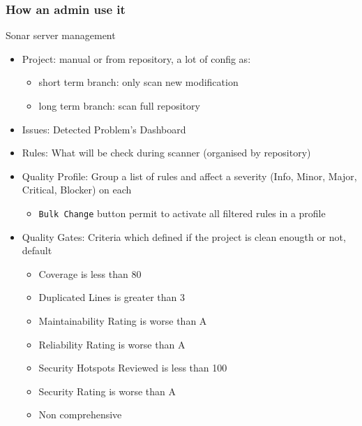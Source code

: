 \subsubsection{How an admin use it}
\begin{frame}[fragile]{\subsubsecname}
  Sonar server management
  \begin{itemize}
    \item Project: manual or from repository, a lot of config as:
    \begin{itemize}
      \item short term branch: only scan new modification
      \item long term branch: scan full repository
    \end{itemize}
    \item Issues: Detected Problem's Dashboard
    \item Rules: What will be check during scanner (organised by repository)
    \item Quality Profile: Group a list of rules and affect a severity (Info, Minor, Major, Critical, Blocker) on each
    \begin{itemize}
      \item \texttt{Bulk Change} button permit to activate all filtered rules in a profile
    \end{itemize}
    \item Quality Gates: Criteria which defined if the project is clean enougth or not, default
    \begin{itemize}
      \item Coverage is less than 80%
      \item Duplicated Lines is greater than 3%
      \item Maintainability Rating is worse than A
      \item Reliability Rating is worse than A
      \item Security Hotspots Reviewed is less than 100%
      \item Security Rating is worse than A
      \item Non comprehensive
    \end{itemize}
  \end{itemize}
\end{frame}
